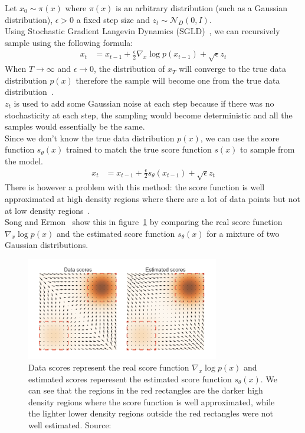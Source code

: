 \documentclass{article}
\numberwithin{equation}{section}
\numberwithin{figure}{section}
\begin{document}
Let $x_0 \sim \pi (x)$ where $\pi (x)$ is an arbitrary distribution (such as a Gaussian distribution), $\epsilon > 0$ a fixed step size and $z_t \sim \mathcal{N}_D (0, I)$. \\
Using Stochastic Gradient Langevin Dynamics (SGLD)~\cite{song2020generative, WelTeh2011a}, we can recursively sample using the following formula:
\begin{align}
  x_t &= x_{t-1} + \frac{\epsilon}{2} \nabla_x \log p(x_{t-1}) + \sqrt{\epsilon} z_t
\end{align}
When $T \rightarrow \infty$ and $\epsilon \rightarrow 0$, the distribution of $x_T$ will converge to the true data distribution $p(x)$ therefore the sample will become one from the true data distribution~\cite{song2020generative,WelTeh2011a}. \\
$z_t$ is used to add some Gaussian noise at each step because if there was no stochasticity at each step, the sampling would become deterministic and all the samples would essentially be the same.\\
Since we don't know the true data distribution $p(x)$, we can use the score function $s_\theta (x)$ trained to match the true score function $s(x)$ to sample from the model. \\
\begin{align}
  x_t &= x_{t-1} + \frac{\epsilon}{2} s_\theta (x_{t-1}) + \sqrt{\epsilon} z_t
\end{align}
There is however a problem with this method: the score function is well approximated at high density regions where there are a lot of data points but not at low density regions~\cite{song2020generative}. \\
Song and Ermon~\cite{song2020generative} show this in figure~\ref{fig:scores} by comparing the real score function $\nabla_x \log p(x)$ and the estimated score function $s_\theta (x)$ for a mixture of two Gaussian distributions.
\begin{figure}[h]
  \begin{center}
    \includegraphics[width= 0.75\textwidth]{images/highlowdensity.png}
    \caption{Data scores represent the real score function $\nabla_x \log p(x)$ and estimated scores reperesent the estimated score function $s_\theta (x)$. We can see that the regions in the red rectangles are the darker high density regions where the score function is well approximated, while the lighter lower density regions outside the red rectangles were not well estimated. Source:~\cite{song2020generative}}\label{fig:scores}
  \end{center}
\end{figure}
\end{document}
